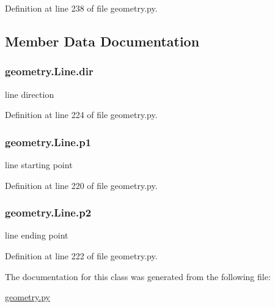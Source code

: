 Definition at line 238 of file geometry.\+py.



\subsection{Member Data Documentation}
\subsubsection[{\texorpdfstring{dir}{dir}}]{\setlength{\rightskip}{0pt plus 5cm}geometry.\+Line.\+dir}\hypertarget{classgeometry_1_1Line_a184c36a24c5e66becce19c0fe53c8b95}{}\label{classgeometry_1_1Line_a184c36a24c5e66becce19c0fe53c8b95}


line direction 



Definition at line 224 of file geometry.\+py.

\subsubsection[{\texorpdfstring{p1}{p1}}]{\setlength{\rightskip}{0pt plus 5cm}geometry.\+Line.\+p1}\hypertarget{classgeometry_1_1Line_aa46ea22a1b33099cbfa26a1646595a40}{}\label{classgeometry_1_1Line_aa46ea22a1b33099cbfa26a1646595a40}


line starting point 



Definition at line 220 of file geometry.\+py.

\subsubsection[{\texorpdfstring{p2}{p2}}]{\setlength{\rightskip}{0pt plus 5cm}geometry.\+Line.\+p2}\hypertarget{classgeometry_1_1Line_a10b5fbbd99ed5d63848a09e50a782cdf}{}\label{classgeometry_1_1Line_a10b5fbbd99ed5d63848a09e50a782cdf}


line ending point 



Definition at line 222 of file geometry.\+py.



The documentation for this class was generated from the following file\+:\begin{DoxyCompactItemize}
\item 
\hyperlink{geometry_8py}{geometry.\+py}\end{DoxyCompactItemize}
